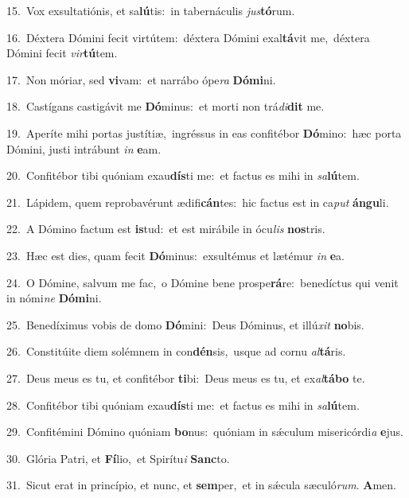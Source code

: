 {\numbfont\textcolor{\numbcolor}{15.}}~Vox exsultatiónis, et sa\-\textbf{lú}\-tis:~\star in tabernáculis \textit{jus}\-\textbf{tó}rum.\par
{\numbfont\textcolor{\numbcolor}{16.}}~Déxtera Dómini fecit virtútem:~\dagger déxtera Dómini exal\-\textbf{tá}\-vit me,~\star déxtera Dómini fecit \textit{vir}\-\textbf{tú}tem.\par
{\numbfont\textcolor{\numbcolor}{17.}}~Non móriar, sed \textbf{vi}\-vam:~\star et narrábo ópe\textit{ra} \textbf{Dó}\-\textbf{mi}ni.\par
{\numbfont\textcolor{\numbcolor}{18.}}~Castígans castigávit me \textbf{Dó}\-minus:~\star et morti non trá\-\textit{di}\-\textbf{dit} me.\par
{\numbfont\textcolor{\numbcolor}{19.}}~Aperíte mihi portas justítiæ,~\dagger ingréssus in eas confitébor \textbf{Dó}\-mino:~\star hæc porta Dómini, justi intrábunt \textit{in} \textbf{e}\-am.\par
{\numbfont\textcolor{\numbcolor}{20.}}~Confitébor tibi quóniam exau\-\textbf{dís}\-ti me:~\star et factus es mihi in \textit{sa}\-\textbf{lú}tem.\par
{\numbfont\textcolor{\numbcolor}{21.}}~Lápidem, quem reprobavérunt ædifi\-\textbf{cán}\-tes:~\star hic factus est in ca\textit{put} \textbf{án}\-\textbf{gu}li.\par
{\numbfont\textcolor{\numbcolor}{22.}}~A Dómino factum est \textbf{is}\-tud:~\star et est mirábile in ócu\textit{lis} \textbf{nos}\-tris.\par
{\numbfont\textcolor{\numbcolor}{23.}}~Hæc est dies, quam fecit \textbf{Dó}\-minus:~\star exsultémus et lætémur \textit{in} \textbf{e}\-a.\par
{\numbfont\textcolor{\numbcolor}{24.}}~O Dómine, salvum me fac,~\dagger o Dómine bene prospe\-\textbf{rá}\-re:~\star benedíctus qui venit in nómi\textit{ne} \textbf{Dó}\-\textbf{mi}ni.\par
{\numbfont\textcolor{\numbcolor}{25.}}~Benedíximus vobis de domo \textbf{Dó}\-mini:~\star Deus Dóminus, et illú\textit{xit} \textbf{no}\-bis.\par
{\numbfont\textcolor{\numbcolor}{26.}}~Constitúite diem solémnem in con\-\textbf{dén}\-sis,~\star usque ad cornu \textit{al}\-\textbf{tá}ris.\par
{\numbfont\textcolor{\numbcolor}{27.}}~Deus meus es tu, et confitébor \textbf{ti}\-bi:~\star Deus meus es tu, et ex\-\textit{al}\-\textbf{tá}\textbf{bo} te.\par
{\numbfont\textcolor{\numbcolor}{28.}}~Confitébor tibi quóniam exau\-\textbf{dís}\-ti me:~\star et factus es mihi in \textit{sa}\-\textbf{lú}tem.\par
{\numbfont\textcolor{\numbcolor}{29.}}~Confitémini Dómino quóniam \textbf{bo}\-nus:~\star quóniam in sǽculum misericórdi\textit{a} \textbf{e}\-jus.\par
{\numbfont\textcolor{\numbcolor}{30.}}~Glória Patri, et \textbf{Fí}\-lio,~\star et Spirítu\textit{i} \textbf{Sanc}\-to.\par
{\numbfont\textcolor{\numbcolor}{31.}}~Sicut erat in princípio, et nunc, et \textbf{sem}\-per,~\star et in sǽcula sæculó\-\textit{rum}\-. \textbf{A}\-men.\par
